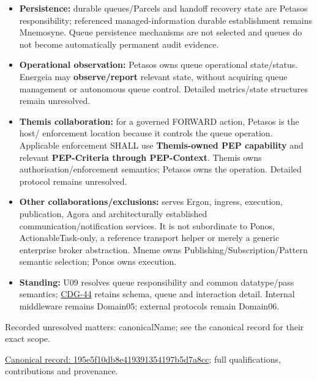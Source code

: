 \begin{itemize}


\item \textbf{Persistence:} durable queues/Parcels and handoff recovery state are Petasos
  responsibility; referenced managed-information durable establishment remains
  Mnemosyne. Queue persistence mechanisms are not selected and queues do not
  become automatically permanent audit evidence.

\item \textbf{Operational observation:} Petasos owns queue operational state/status.
  Energeia may \textbf{observe/report} relevant state, without acquiring queue management
  or autonomous queue control. Detailed metrics/state structures remain unresolved.

\item \textbf{Themis collaboration:} for a governed FORWARD action, Petasos is the host/
  enforcement location because it controls the queue operation. Applicable
  enforcement SHALL use \textbf{Themis-owned PEP capability} and relevant \textbf{PEP-Criteria through PEP-Context}. Themis owns authorisation/enforcement semantics; Petasos owns the
  operation. Detailed protocol remains unresolved.

\item \textbf{Other collaborations/exclusions:} serves Ergon, ingress, execution,
  publication, Agora and architecturally established communication/notification
  services. It is not subordinate to Ponos, ActionableTask-only, a reference
  transport helper or merely a generic enterprise broker abstraction. Mneme owns
  Publishing/Subscription/Pattern semantic selection; Ponos owns execution.

\item \textbf{Standing:} U09 resolves queue responsibility and common datatype/pass semantics;
  \href{\detokenize{../../../../../docs/markdown/05-information-systems-architecture/gaps.md#petasos-detailed-contracts}}{CDG-44} retains schema, queue and interaction
  detail. Internal middleware remains Domain05; external protocols remain Domain06.

\end{itemize}

{\small Recorded unresolved matters: canonicalName; see the canonical record for their exact scope.}\par
{\footnotesize \href{../../../../continuum/application/application-component/195e5f10db8e419391354197b5d7a8cc.md}{Canonical record: 195e5f10db8e419391354197b5d7a8cc}; full qualifications, contributions and provenance.}\par
